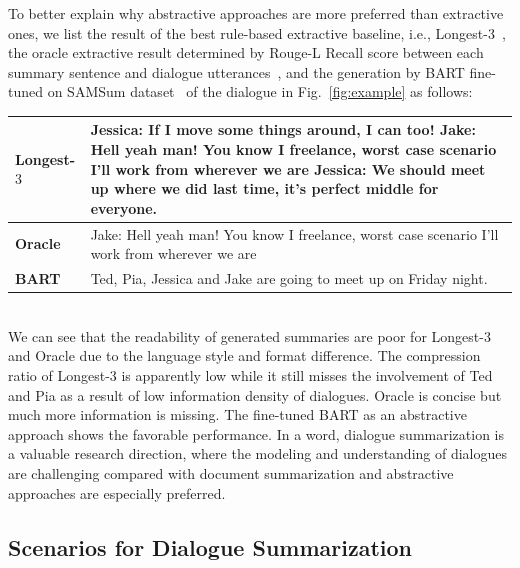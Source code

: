 To better explain why abstractive approaches are more preferred than extractive ones, we list the result of the best rule-based extractive baseline, i.e., Longest-$3$~\cite{gliwa2019samsum}, the oracle extractive result determined by Rouge-L Recall score between each summary sentence and dialogue utterances~\cite{chen2018fast}, and the generation by BART fine-tuned on SAMSum dataset~\cite{gliwa2019samsum} of the dialogue in Fig.~\ref{fig:example} as follows:
\\
{
\scriptsize
\begin{tabular}{|p{1.5cm}|p{\linewidth-2.3cm}|}
	\hline
	\textbf{Longest-$3$} & Jessica: If I move some things around, I can too! Jake: Hell yeah man! You know I freelance, worst case scenario I'll work from wherever we are Jessica: We should meet up where we did last time, it's perfect middle for everyone.\\
	\hline
	\textbf{Oracle} & Jake: Hell yeah man! You know I freelance, worst case scenario I'll work from wherever we are\\
	\hline
	\textbf{BART}& Ted, Pia, Jessica and Jake are going to meet up on Friday night. \\
	\hline
\end{tabular}
}
\\
We can see that the readability of generated summaries are poor for Longest-$3$ and Oracle due to the language style and format difference. The compression ratio of Longest-$3$ is apparently low while it still misses the involvement of Ted and Pia as a result of low information density of dialogues. Oracle is concise but much more information is missing. The fine-tuned BART as an abstractive approach shows the favorable performance. 
In a word, dialogue summarization is a valuable research direction, where the modeling and understanding of dialogues are challenging compared with document summarization and abstractive approaches are especially preferred.


\subsection{Scenarios for Dialogue Summarization}\label{sec:scenarios}

